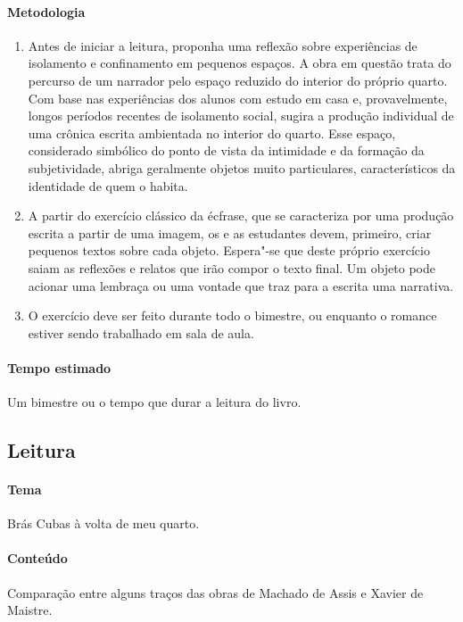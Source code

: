 \documentclass[12pt]{extarticle}
\begin{document}
\paragraph{Metodologia}
\begin{enumerate}
	\item
	Antes de iniciar a leitura, proponha uma reflexão sobre
experiências de isolamento e confinamento em pequenos espaços. A obra em
questão trata do percurso de um narrador pelo espaço reduzido do
interior do próprio quarto. Com base nas experiências dos alunos com
estudo em casa e, provavelmente, longos períodos recentes de isolamento
social, sugira a produção individual de uma crônica escrita
ambientada no interior do quarto. Esse espaço, considerado simbólico do
ponto de vista da intimidade e da formação da subjetividade, abriga
geralmente objetos muito particulares, característicos da identidade de
quem o habita.
	\item
	A partir do exercício clássico da écfrase, que se caracteriza por uma
	produção escrita a partir de uma imagem, os e as estudantes devem, primeiro,
	criar pequenos textos sobre cada objeto. Espera"-se que deste próprio
	exercício saiam as reflexões e relatos que irão compor o texto final.
	Um objeto pode acionar uma lembraça ou uma vontade que traz para a escrita
	uma narrativa. 
	\item 
	O exercício deve ser feito durante todo o bimestre, ou enquanto
	o romance estiver sendo trabalhado em sala de aula.

\end{enumerate}

\paragraph{Tempo estimado} Um bimestre ou o tempo que durar a leitura do livro.



\subsection{Leitura}


\paragraph{Tema} Brás Cubas à volta de meu quarto.

\paragraph{Conteúdo} Comparação entre alguns traços das obras de Machado de Assis e 
Xavier de Maistre.
\end{document}
